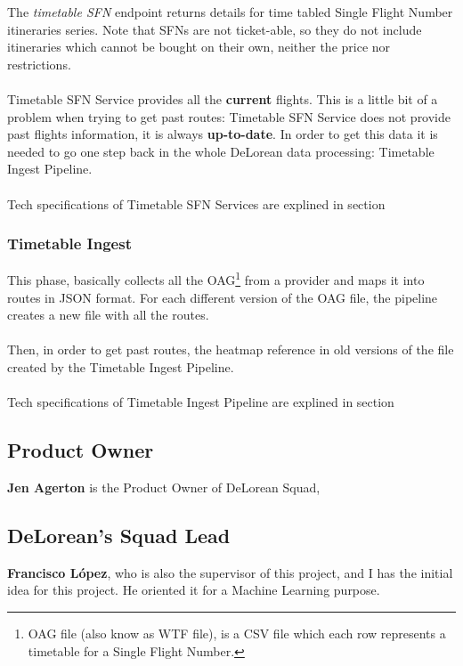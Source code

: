 The \textit{timetable SFN} endpoint returns details for time tabled Single Flight Number itineraries series. Note that SFNs are not ticket-able, so they do not include itineraries which cannot be bought on their own, neither the price nor restrictions.
\\\\
Timetable SFN Service provides all the \textbf{current} flights. This is a little bit of a problem when trying to get past routes: Timetable SFN Service does not provide past flights information, it is always \textbf{up-to-date}. In order to get this data it is needed to go one step back in the whole DeLorean data processing: Timetable Ingest Pipeline.
\\\\
Tech specifications of Timetable SFN Services are explined in section %

\subsubsection{Timetable Ingest}

This phase, basically collects all the OAG\footnote{OAG file (also know as WTF file), is a CSV\cite{csv} file which each row represents a timetable for a Single Flight Number.} from a provider and maps it into routes in JSON\cite{json} format. For each different version of the OAG file, the pipeline creates a new file with all the routes.
\\\\
Then, in order to get past routes, the heatmap reference in old versions of the file created by the Timetable Ingest Pipeline.
\\\\
Tech specifications of Timetable Ingest Pipeline are explined in section %

\subsection{Product Owner} \label{product_owner}

\textbf{Jen Agerton} is the Product Owner of DeLorean Squad, 

\subsection{DeLorean's Squad Lead}

\textbf{Francisco López}, who is also the supervisor of this project, and I has the initial idea for this project. He oriented it for a Machine Learning purpose.

